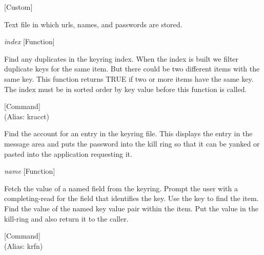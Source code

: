 \vspace{1em}
\noindent
{}
\usebox{\funcname}
 \hfill [Custom]

\begin{doc-string}
Text file in which urls, names, and passwords are stored.
\end{doc-string}

\vspace{1em}
\noindent
{}
\usebox{\funcname}\emph{index}
 \hfill [Function]

\begin{doc-string}
Find any duplicates in the keyring index.  When the index is built we filter duplicate
keys for the same item.  But there could be two different items with the same key.  This
function returns TRUE if two or more items have the same key.  The index must be in sorted
order by key value before this function is called.
\end{doc-string}

\vspace{1em}
\noindent
{}
\usebox{\funcname}
 \hfill [Command]\\%
 (Alias: kracct)

\begin{doc-string}
Find the account for an entry in the keyring file.  This displays the entry in the message
area and puts the password into the kill ring so that it can be yanked or pasted into the application
requesting it.
\end{doc-string}

\vspace{1em}
\noindent
{}
\usebox{\funcname}\emph{name}
 \hfill [Function]

\begin{doc-string}
Fetch the value of a named field from the keyring.  Prompt the user with a completing-read
for the field that identifies the key.  Use the key to find the item.  Find the value of the named
key value pair within the item.  Put the value in the kill-ring and also return it to the caller.
\end{doc-string}

\vspace{1em}
\noindent
{}
\usebox{\funcname}
 \hfill [Command]\\%
 (Alias: krfn)

